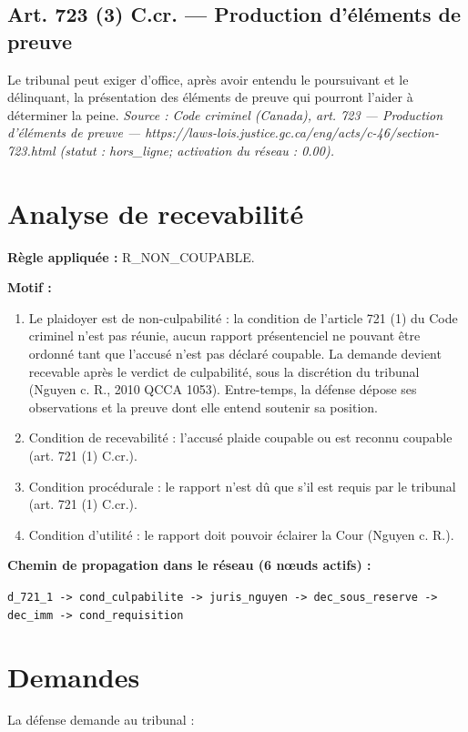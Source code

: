 \documentclass[12pt,a4paper]{article}
\begin{document}
\subsection*{Art. 723 (3) C.cr. — Production d'éléments de preuve}
Le tribunal peut exiger d'office, après avoir entendu le poursuivant et le délinquant, la présentation des éléments de preuve qui pourront l'aider à déterminer la peine.
\emph{Source : Code criminel (Canada), art. 723 — Production d'éléments de preuve — https://laws-lois.justice.gc.ca/eng/acts/c-46/section-723.html (statut : hors\_ligne; activation du réseau : 0.00).}


\section{Analyse de recevabilité}
\textbf{Règle appliquée :} R\_NON\_COUPABLE.

\textbf{Motif :}

\begin{enumerate}[leftmargin=*]
\item Le plaidoyer est de non-culpabilité : la condition de l'article 721 (1) du Code criminel n'est pas réunie, aucun rapport présentenciel ne pouvant être ordonné tant que l'accusé n'est pas déclaré coupable. La demande devient recevable après le verdict de culpabilité, sous la discrétion du tribunal (Nguyen c. R., 2010 QCCA 1053). Entre-temps, la défense dépose ses observations et la preuve dont elle entend soutenir sa position.
\item Condition de recevabilité : l'accusé plaide coupable ou est reconnu coupable (art. 721 (1) C.cr.).
\item Condition procédurale : le rapport n'est dû que s'il est requis par le tribunal (art. 721 (1) C.cr.).
\item Condition d'utilité : le rapport doit pouvoir éclairer la Cour (Nguyen c. R.).
\end{enumerate}

\textbf{Chemin de propagation dans le réseau (6 nœuds actifs) :}

\texttt{d\_721\_1 -> cond\_culpabilite -> juris\_nguyen -> dec\_sous\_reserve -> dec\_imm -> cond\_requisition}


\section{Demandes}
La défense demande au tribunal :
\end{document}
